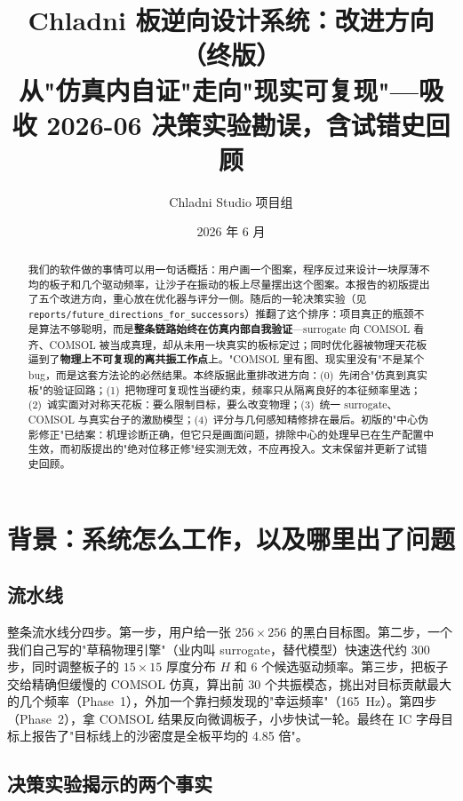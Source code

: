\documentclass[11pt,a4paper]{article}
\title{\textbf{Chladni 板逆向设计系统：改进方向（终版）\\
\large 从"仿真内自证"走向"现实可复现"---吸收 2026-06 决策实验勘误，含试错史回顾}}
\author{Chladni Studio 项目组}
\date{2026 年 6 月}
\newcommand{\code}[1]{\texttt{#1}}
\begin{document}
\maketitle

\begin{abstract}
我们的软件做的事情可以用一句话概括：用户画一个图案，程序反过来设计一块厚薄不均的板子和几个驱动频率，让沙子在振动的板上尽量摆出这个图案。本报告的初版提出了五个改进方向，重心放在优化器与评分一侧。随后的一轮决策实验（见 \code{reports/future\_directions\_for\_successors}）推翻了这个排序：项目真正的瓶颈不是算法不够聪明，而是\textbf{整条链路始终在仿真内部自我验证}---surrogate 向 COMSOL 看齐、COMSOL 被当成真理，却从未用一块真实的板标定过；同时优化器被物理天花板逼到了\textbf{物理上不可复现的离共振工作点}上。"COMSOL 里有图、现实里没有"不是某个 bug，而是这套方法论的必然结果。本终版据此重排改进方向：(0)~先闭合"仿真到真实板"的验证回路；(1)~把物理可复现性当硬约束，频率只从隔离良好的本征频率里选；(2)~诚实面对对称天花板：要么限制目标，要么改变物理；(3)~统一 surrogate、COMSOL 与真实台子的激励模型；(4)~评分与几何感知精修排在最后。初版的"中心伪影修正"已结案：机理诊断正确，但它只是画面问题，排除中心的处理早已在生产配置中生效，而初版提出的"绝对位移正修"经实测无效，不应再投入。文末保留并更新了试错史回顾。
\end{abstract}

\section{背景：系统怎么工作，以及哪里出了问题}

\subsection{流水线}

整条流水线分四步。第一步，用户给一张 $256\times 256$ 的黑白目标图。第二步，一个我们自己写的"草稿物理引擎"（业内叫 surrogate，替代模型）快速迭代约 300 步，同时调整板子的 $15\times 15$ 厚度分布 $H$ 和 6 个候选驱动频率。第三步，把板子交给精确但缓慢的 COMSOL 仿真，算出前 30 个共振模态，挑出对目标贡献最大的几个频率（Phase~1），外加一个靠扫频发现的"幸运频率"（165~Hz）。第四步（Phase~2），拿 COMSOL 结果反向微调板子，小步快试一轮。最终在 IC 字母目标上报告了"目标线上的沙密度是全板平均的 4.85 倍"。

\subsection{决策实验揭示的两个事实}
\end{document}
